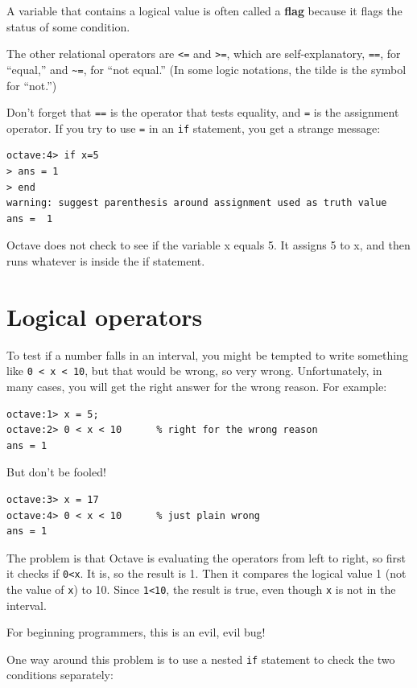 \documentclass{book}
\begin{document}
A variable that contains a logical value is often called a {\bf flag}
because it flags the status of some condition.

The other relational operators are {\tt <=} and {\tt >=}, which are
self-explanatory, {\tt ==}, for ``equal,'' and 
\verb+~=+, for ``not equal.'' (In some logic notations, the tilde
is the symbol for ``not.'')

Don't forget that {\tt ==} is the operator that tests equality,
and {\tt =} is the assignment operator. If you try to use {\tt =} in
an {\tt if} statement, you get a strange message:

\begin{verbatim}
octave:4> if x=5
> ans = 1
> end
warning: suggest parenthesis around assignment used as truth value
ans =  1
\end{verbatim}

Octave does not check to see if the variable x equals 5. It assigns 5 to x, and
then runs whatever is inside the if statement.

\section{Logical operators}
\label{logop}

To test if a number falls in an interval, you might be
tempted to write something like {\tt 0 < x < 10}, but that
would be wrong, so very wrong. Unfortunately, in many cases,
you will get the right answer for the wrong reason. For
example:

\begin{verbatim}
octave:1> x = 5;
octave:2> 0 < x < 10      % right for the wrong reason
ans = 1
\end{verbatim}

But don't be fooled!

\begin{verbatim}
octave:3> x = 17
octave:4> 0 < x < 10      % just plain wrong
ans = 1
\end{verbatim}

The problem is that Octave is evaluating the operators from left
to right, so first it checks if {\tt 0<x}. It is, so the result
is 1. Then it compares the logical value 1 (not the value of
{\tt x}) to 10. Since {\tt 1<10}, the result is true, even though
{\tt x} is not in the interval.

For beginning programmers, this is an evil, evil bug!

One way around this problem is to use a nested {\tt if} statement to
check the two conditions separately:
\end{document}

